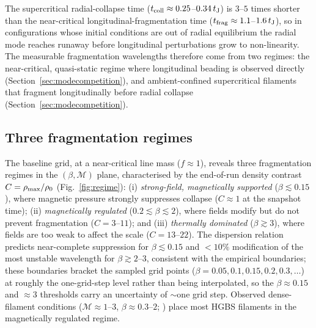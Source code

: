 \documentclass[usenatbib,twoside,twocolumn]{mnras}
\begin{document}
The supercritical radial-collapse time ($t_{\rm coll}\approx0.25$--$0.34\,t_{\rm J}$) is $3$--$5$ times shorter than the near-critical longitudinal-fragmentation time ($t_{\rm frag}\approx1.1$--$1.6\,t_{\rm J}$), so in configurations whose initial conditions are out of radial equilibrium the radial mode reaches runaway before longitudinal perturbations grow to non-linearity. The measurable fragmentation wavelengths therefore come from two regimes: the near-critical, quasi-static regime where longitudinal beading is observed directly (Section~\ref{sec:modecompetition}), and ambient-confined supercritical filaments that fragment longitudinally before radial collapse (Section~\ref{sec:modecompetition}).

\subsection{Three fragmentation regimes}

The baseline grid, at a near-critical line mass ($f\approx1$), reveals three fragmentation regimes in the $(\beta,\mathcal{M})$ plane, characterised by the end-of-run density contrast $C=\rho_{\rm max}/\rho_0$ (Fig.~\ref{fig:regime}): (i) \emph{strong-field, magnetically supported} ($\beta\lesssim0.15$), where magnetic pressure strongly suppresses collapse ($C\approx1$ at the snapshot time); (ii) \emph{magnetically regulated} ($0.2\lesssim\beta\lesssim2$), where fields modify but do not prevent fragmentation ($C=3$--$11$); and (iii) \emph{thermally dominated} ($\beta\gtrsim3$), where fields are too weak to affect the scale ($C=13$--$22$). The dispersion relation \citep{Nakamura1993} predicts near-complete suppression for $\beta\lesssim0.15$ and $<10\%$ modification of the most unstable wavelength for $\beta\gtrsim2$--$3$, consistent with the empirical boundaries; these boundaries bracket the sampled grid points ($\beta=0.05,0.1,0.15,0.2,0.3,\ldots$) at roughly the one-grid-step level rather than being interpolated, so the $\beta\approx0.15$ and $\approx3$ thresholds carry an uncertainty of $\sim$one grid step. Observed dense-filament conditions ($\mathcal{M}\approx1$--$3$, $\beta\approx0.3$--$2$; \citealt{Arzoumanian2019,Planck2016,Pattle2018}) place most HGBS filaments in the magnetically regulated regime.
\end{document}
